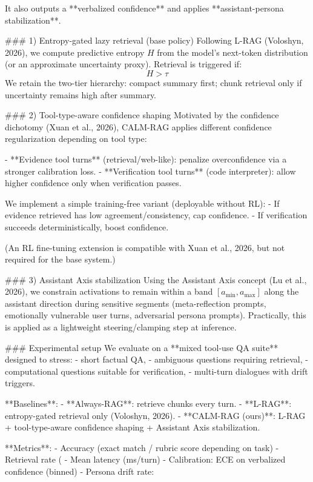 It also outputs a **verbalized confidence** and applies **assistant-persona stabilization**.

### 1) Entropy-gated lazy retrieval (base policy)  
Following L-RAG (Voloshyn, 2026), we compute predictive entropy \(H\) from the model’s next-token distribution (or an approximate uncertainty proxy). Retrieval is triggered if:  
\[
H > \tau
\]
We retain the two-tier hierarchy: compact summary first; chunk retrieval only if uncertainty remains high after summary.

### 2) Tool-type-aware confidence shaping  
Motivated by the confidence dichotomy (Xuan et al., 2026), CALM-RAG applies different confidence regularization depending on tool type:

- **Evidence tool turns** (retrieval/web-like): penalize overconfidence via a stronger calibration loss.  
- **Verification tool turns** (code interpreter): allow higher confidence only when verification passes.

We implement a simple training-free variant (deployable without RL):  
- If evidence retrieved has low agreement/consistency, cap confidence.  
- If verification succeeds deterministically, boost confidence.

(An RL fine-tuning extension is compatible with Xuan et al., 2026, but not required for the base system.)

### 3) Assistant Axis stabilization  
Using the Assistant Axis concept (Lu et al., 2026), we constrain activations to remain within a band \([a_{\min}, a_{\max}]\) along the assistant direction during sensitive segments (meta-reflection prompts, emotionally vulnerable user turns, adversarial persona prompts). Practically, this is applied as a lightweight steering/clamping step at inference.

### Experimental setup  
We evaluate on a **mixed tool-use QA suite** designed to stress:  
- short factual QA,  
- ambiguous questions requiring retrieval,  
- computational questions suitable for verification,  
- multi-turn dialogues with drift triggers.

**Baselines**:  
- **Always-RAG**: retrieve chunks every turn.  
- **L-RAG**: entropy-gated retrieval only (Voloshyn, 2026).  
- **CALM-RAG (ours)**: L-RAG + tool-type-aware confidence shaping + Assistant Axis stabilization.

**Metrics**:  
- Accuracy (exact match / rubric score depending on task)  
- Retrieval rate (%
- Mean latency (ms/turn)  
- Calibration: ECE on verbalized confidence (binned)  
- Persona drift rate: %

